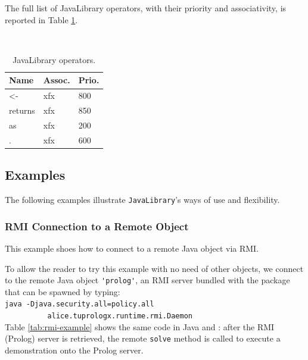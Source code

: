 The full list of JavaLibrary operators, with their priority and associativity, is reported in Table \ref{tab:javalibrary-operators}.

\begin{table}[h]
    \begin{center}{\small\tt
    \begin{tabular}{p{2cm}|p{1cm}|p{1cm}}\hline\hline
    Name & Assoc. & Prio. \\ \hline\hline
    <-   & xfx & 800\\
    returns     & xfx & 850 \\
    as   & xfx & 200\\
    .   & xfx & 600\\
    \hline\hline
    \end{tabular}
    }\end{center}
    \caption{JavaLibrary operators.}\label{tab:javalibrary-operators}
\end{table}



\subsection{Examples}

The following examples illustrate \texttt{JavaLibrary}'s ways of use and flexibility.

\subsubsection{RMI Connection to a Remote Object}

This example shoes how to connect to a remote Java object via RMI.

To allow the reader to try this example with no need of other objects, we connect to the remote Java object \verb|'prolog'|, an RMI server bundled with the \tuprolog{} package that can be spawned by typing:\\

{\small\texttt{java -Djava.security.all=policy.all\\
\mbox{~~~~~~~~~~}alice.tuprologx.runtime.rmi.Daemon}}\\

\noindent Table \ref{tab:rmi-example} shows the same code in Java and \tuprolog{}:
after the RMI (Prolog) server is retrieved, the remote \texttt{solve} method is called to execute a demonstration onto the Prolog server.

